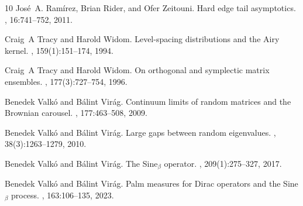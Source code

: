\documentclass[12pt]{article}
\theoremstyle{definition} %
\theoremstyle{remark} %
\begin{document}
\begin{thebibliography}{10}
Jos\'e{}~A. Ram\'irez, Brian Rider, and Ofer Zeitouni.
\newblock Hard edge tail asymptotics.
, 16:741--752, 2011.

Craig~A Tracy and Harold Widom.
\newblock Level-spacing distributions and the {A}iry kernel.
, 159(1):151--174, 1994.

Craig~A Tracy and Harold Widom.
\newblock On orthogonal and symplectic matrix ensembles.
, 177(3):727--754, 1996.

Benedek Valk\'o and B\'alint Vir\'ag.
\newblock Continuum limits of random matrices and the {B}rownian carousel.
, 177:463--508, 2009.

Benedek Valk{{\'o}} and B{{\'a}}lint Vir{{\'a}}g.
\newblock Large gaps between random eigenvalues.
, 38(3):1263--1279, 2010.

Benedek Valk{\'o} and B{\'a}lint Vir{\'a}g.
\newblock The {Sine$_\beta$} operator.
, 209(1):275--327, 2017.

Benedek Valk{\'o} and B{\'a}lint Vir{\'a}g.
\newblock Palm measures for {D}irac operators and the {S}ine$_\beta$ process.
, 163:106--135,
  2023.

\end{thebibliography}
\end{document}
